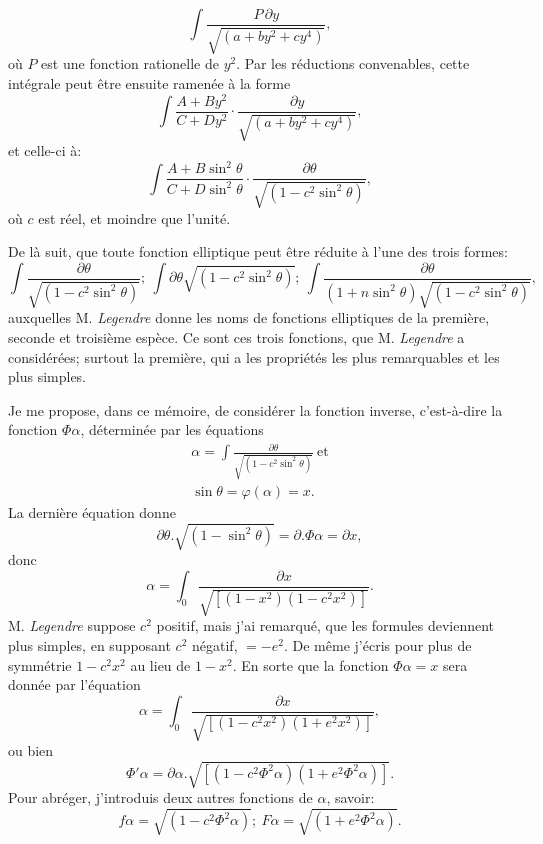 \documentclass{article}
\begin{document}
\[ \int\frac{P\,\partial y}{\sqrt{(a+by^{2}+cy^{4})}}, \]
où $P$ est une fonction rationelle de $y^{2}$. Par les réductions convenables, cette intégrale peut être ensuite ramenée à la forme
\[ \int\frac{A+By^{2}}{C+Dy^{2}}\cdot\frac{\partial y}{\sqrt{(a+by^{2}+cy^{4})}}, \]
et celle-ci à:
\[ \int\frac{A+B\sin^{2}\theta}{C+D\sin^{2}\theta}\cdot\frac{\partial\theta}{\sqrt{(1-c^{2}\sin^{2}\theta)}}, \]
où $c$ est réel, et moindre que l'unité.

De là suit, que toute fonction elliptique peut être réduite à l'une des trois formes:
\[ \int\frac{\partial\theta}{\sqrt{(1-c^{2}\sin^{2}\theta)}};\ \int\partial\theta\sqrt{(1-c^{2}\sin^{2}\theta)};\ \int\frac{\partial\theta}{(1+n\sin^{2}\theta)\sqrt{(1-c^{2}\sin^{2}\theta)}}, \]
auxquelles M. \emph{Legendre} donne les noms de fonctions elliptiques de la première, seconde et troisième espèce. Ce sont ces trois fonctions, que M. \emph{Legendre} a considérées; surtout la première, qui a les propriétés les plus remarquables et les plus simples.

Je me propose, dans ce mémoire, de considérer la fonction inverse, c'est-à-dire la fonction $\Phi\alpha$, déterminée par les équations
\[ \begin{gathered} \alpha=\int\frac{\partial\theta}{\sqrt{(1-c^{2}\sin^{2}\theta)}}\ \text{et}\\ \sin\theta=\varphi(\alpha)=x. \end{gathered} \]
La dernière équation donne
\[ \partial\theta.\sqrt{(1-\sin^{2}\theta)}=\partial.\Phi\alpha=\partial x, \]
donc
\[ \alpha=\int_{0}\frac{\partial x}{\sqrt{[(1-x^{2})(1-c^{2}x^{2})]}}. \]
M. \emph{Legendre} suppose $c^{2}$ positif, mais j'ai remarqué, que les formules deviennent plus simples, en supposant $c^{2}$ négatif, $=-e^{2}$. De même j'écris pour plus de symmétrie $1-c^{2}x^{2}$ au lieu de $1-x^{2}$. En sorte que la fonction $\Phi\alpha=x$ sera donnée par l'équation
\[ \alpha=\int_{0}\frac{\partial x}{\sqrt{[(1-c^{2}x^{2})(1+e^{2}x^{2})]}}, \]
ou bien
\[ \Phi'\alpha=\partial\alpha.\sqrt{[(1-c^{2}\Phi^{2}\alpha)(1+e^{2}\Phi^{2}\alpha)]}.\]
Pour abréger, j'introduis deux autres fonctions de $\alpha$, savoir:
\[ f\alpha=\sqrt{(1-c^{2}\Phi^{2}\alpha)};\ F\alpha=\sqrt{(1+e^{2}\Phi^{2}\alpha)}. \]

\end{document}
